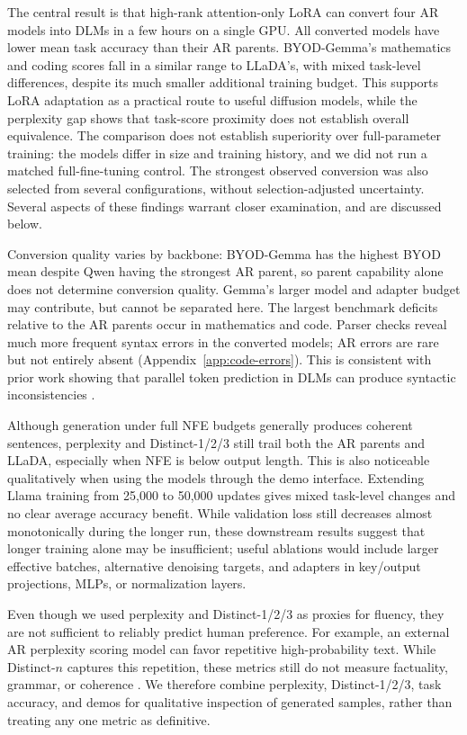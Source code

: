 \documentclass{article}
\begin{document}
The central result is that high-rank attention-only LoRA can convert four AR models into DLMs in a few hours on a single GPU. All converted models have lower mean task accuracy than their AR parents. BYOD-Gemma's mathematics and coding scores fall in a similar range to LLaDA's, with mixed task-level differences, despite its much smaller additional training budget. This supports LoRA adaptation as a practical route to useful diffusion models, while the perplexity gap shows that task-score proximity does not establish overall equivalence. The comparison does not establish superiority over full-parameter training: the models differ in size and training history, and we did not run a matched full-fine-tuning control. The strongest observed conversion was also selected from several configurations, without selection-adjusted uncertainty. Several aspects of these findings warrant closer examination, and are discussed below.

Conversion quality varies by backbone: BYOD-Gemma has the highest BYOD mean despite Qwen having the strongest AR parent, so parent capability alone does not determine conversion quality. Gemma's larger model and adapter budget may contribute, but cannot be separated here. The largest benchmark deficits relative to the AR parents occur in mathematics and code. Parser checks reveal much more frequent syntax errors in the converted models; AR errors are rare but not entirely absent (Appendix~\ref{app:code-errors}). This is consistent with prior work showing that parallel token prediction in DLMs can produce syntactic inconsistencies \citep{hersche2026codila}.

Although generation under full NFE budgets generally produces coherent sentences, perplexity and Distinct-1/2/3 still trail both the AR parents and LLaDA, especially when NFE is below output length. This is also noticeable qualitatively when using the models through the demo interface. Extending Llama training from 25,000 to 50,000 updates gives mixed task-level changes and no clear average accuracy benefit. While validation loss still decreases almost monotonically during the longer run, these downstream results suggest that longer training alone may be insufficient; useful ablations would include larger effective batches, alternative denoising targets, and adapters in key/output projections, MLPs, or normalization layers.

Even though we used perplexity and Distinct-1/2/3 as proxies for fluency, they are not sufficient to reliably predict human preference. For example, an external AR perplexity scoring model can favor repetitive high-probability text. While Distinct-$n$ captures this repetition, these metrics still do not measure factuality, grammar, or coherence \citep{gong2025diffullama,turok2026duel}. We therefore combine perplexity, Distinct-1/2/3, task accuracy, and demos for qualitative inspection of generated samples, rather than treating any one metric as definitive.
\end{document}
